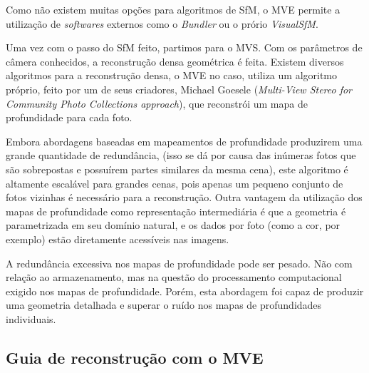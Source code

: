 Como não existem muitas opções para algoritmos de SfM, o MVE permite a utilização de {\it softwares} externos como o {\it Bundler} ou o prório {\it VisualSfM}.

Uma vez com o passo do SfM feito, partimos para o MVS. Com os parâmetros de câmera conhecidos, a reconstrução densa geométrica é feita. Existem diversos algoritmos para a reconstrução densa, o MVE no caso, utiliza um algoritmo próprio, feito por um de seus criadores, Michael Goesele ({\it Multi-View Stereo for Community Photo Collections approach}), que reconstrói um mapa de profundidade para cada foto. 

Embora abordagens baseadas em mapeamentos de profundidade produzirem uma grande quantidade de redundância, (isso se dá por causa das inúmeras fotos que são sobrepostas e possuírem partes similares da mesma cena), este algoritmo é altamente escalável para grandes cenas, pois apenas um pequeno conjunto de fotos vizinhas é necessário para a reconstrução. Outra vantagem da utilização dos mapas de profundidade como representação intermediária é que a geometria é parametrizada em seu domínio natural, e os dados por foto (como a cor, por exemplo) estão diretamente acessíveis nas imagens.

A redundância excessiva nos mapas de profundidade pode ser pesado. Não com relação ao armazenamento, mas na questão do processamento computacional exigido nos mapas de profundidade. Porém, esta abordagem foi capaz de produzir uma geometria detalhada e superar o ruído nos mapas de profundidades individuais.

\subsection{Guia de reconstrução com o MVE}


